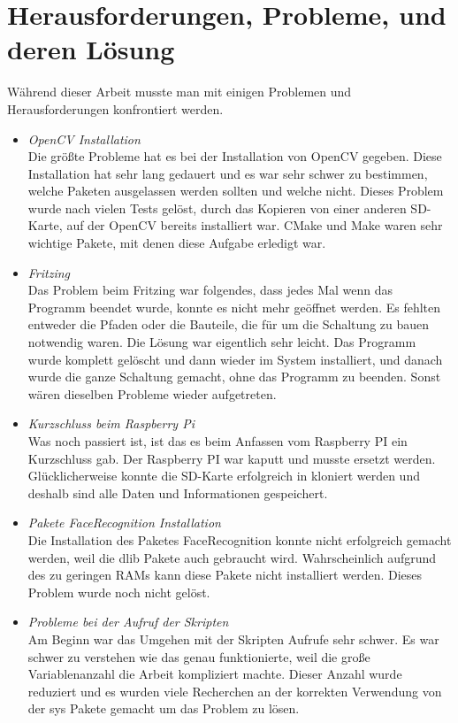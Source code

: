 	\section{Herausforderungen, Probleme, und deren Lösung}
	W{\"a}hrend dieser Arbeit musste man mit einigen Problemen und Herausforderungen konfrontiert werden.
	\begin{itemize}
		\item \textit{OpenCV Installation}\\
		Die gr{\"o}ßte Probleme hat es bei der Installation von OpenCV gegeben. Diese Installation hat sehr lang gedauert und es war sehr schwer zu bestimmen, welche Paketen ausgelassen werden sollten und welche nicht. Dieses Problem wurde nach vielen Tests gel{\"o}st, durch das Kopieren von einer anderen SD-Karte, auf der OpenCV bereits installiert war. CMake und Make waren sehr wichtige Pakete, mit denen diese Aufgabe erledigt war.
		\item \textit{Fritzing} \\
		Das Problem beim Fritzing war folgendes, dass jedes Mal wenn das Programm beendet wurde, konnte es nicht mehr ge{\"o}ffnet werden. Es fehlten entweder die Pfaden oder die Bauteile, die f{\"u}r um die Schaltung zu bauen notwendig waren. Die L{\"o}sung war eigentlich sehr leicht. Das Programm wurde komplett gel{\"o}scht und dann wieder im System installiert, und danach wurde die ganze Schaltung gemacht, ohne das Programm zu beenden. Sonst wären dieselben Probleme wieder aufgetreten.
		\item \textit{Kurzschluss beim Raspberry Pi}\\
		Was noch passiert ist, ist das es beim Anfassen vom Raspberry PI ein Kurzschluss gab. Der Raspberry PI war kaputt und musste ersetzt werden. Glücklicherweise konnte die SD-Karte erfolgreich in kloniert werden und deshalb sind alle Daten und Informationen gespeichert.
		\item \textit{Pakete FaceRecognition Installation} \\
		Die Installation des Paketes FaceRecognition konnte nicht erfolgreich gemacht werden, weil die dlib Pakete auch gebraucht wird. Wahrscheinlich aufgrund des zu geringen RAMs kann diese Pakete nicht installiert werden. Dieses Problem wurde noch nicht gel{\"o}st.
		\item \textit{Probleme bei der Aufruf der Skripten } \\
		Am Beginn war das Umgehen mit der Skripten Aufrufe sehr schwer. Es war schwer zu verstehen wie das genau funktionierte, weil die große Variablenanzahl die Arbeit kompliziert machte. Dieser Anzahl wurde reduziert und es wurden viele Recherchen an der korrekten Verwendung von der sys Pakete gemacht um das Problem zu l{\"o}sen.
	\end{itemize}
